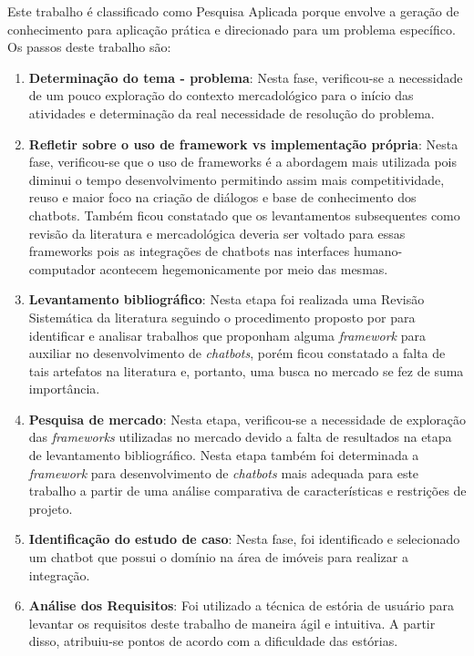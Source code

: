 Este trabalho é classificado como Pesquisa Aplicada porque envolve a geração de conhecimento para aplicação prática e direcionado para um problema específico. Os passos deste trabalho são:


\begin{enumerate}
    \item \textbf{Determinação do tema - problema}: Nesta fase, verificou-se a necessidade de um pouco
exploração do contexto mercadológico para o início das atividades e determinação da real necessidade de resolução do problema.

\item \textbf{Refletir sobre o uso de framework vs implementação própria}: Nesta fase,  verificou-se que o uso de frameworks é a abordagem mais utilizada pois diminui o tempo desenvolvimento permitindo assim mais competitividade, reuso e maior foco na criação de diálogos e base de conhecimento dos chatbots. Também ficou constatado que os levantamentos subsequentes como revisão da literatura e mercadológica deveria ser voltado para essas frameworks pois as integrações de chatbots nas interfaces humano-computador acontecem hegemonicamente por meio das mesmas. 

    \item \textbf{Levantamento bibliográfico}: Nesta etapa foi realizada uma Revisão Sistemática da literatura seguindo o procedimento proposto por \cite{kitchenham2004procedures} para identificar e analisar trabalhos que proponham alguma \textit{framework} para auxiliar no desenvolvimento de \textit{chatbots}, porém ficou constatado a falta de tais artefatos na literatura e, portanto, uma busca no mercado se fez de suma importância.
    \item \textbf{Pesquisa de mercado}: Nesta etapa, verificou-se a necessidade de exploração das \textit{frameworks} utilizadas no mercado devido a falta de resultados na etapa de levantamento bibliográfico. Nesta etapa  também foi determinada a \textit{framework} para desenvolvimento de \textit{chatbots} mais adequada para este trabalho a partir de uma análise comparativa de características e restrições de projeto.
    
        
    \item \textbf{Identificação do estudo de caso}: Nesta fase, foi identificado e selecionado um chatbot que possui o domínio na área de imóveis para realizar a integração.
    
    \item \textbf{Análise dos Requisitos}: Foi utilizado a técnica de estória de usuário para levantar os requisitos deste trabalho de maneira ágil e intuitiva. A partir disso, atribuiu-se pontos de acordo com a dificuldade das estórias.


\end{enumerate}
